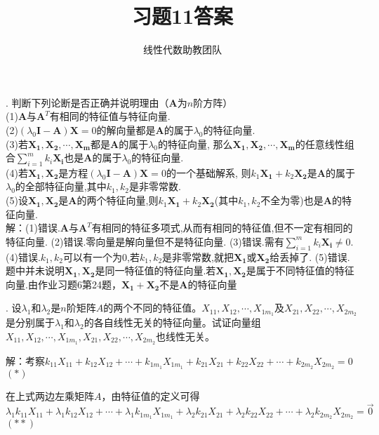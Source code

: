 \documentclass[10pt,twocolumn,letterpaper]{article}
\title{习题11答案}
\author{线性代数助教团队}
\theoremstyle{mythmstyle}
\begin{document}
\maketitle

. 判断下列论断是否正确并说明理由（$\bm{A}$为$n$阶方阵）\\
(1)$\bm{A}$与$\bm{A}^T$有相同的特征值与特征向量.\\
(2)$\left( {{\lambda _0}\bm{I} - \bm{A}} \right)\bm{X} = 0$的解向量都是$\bm{A}$的属于${\lambda _0}$的特征向量.\\
(3)若$\bm{X_1,X_2, \cdots ,X_m}$都是$\bm{A}$的属于${\lambda _0}$的特征向量,
那么$\bm{X_1,X_2, \cdots ,X_m}$的任意线性组合$\sum\limits_{i = 1}^m {{k_i}\bm{X_i}} $也是$\bm{A}$的属于${\lambda _0}$的特征向量.\\
(4)若$\bm{X_1,X_2}$是方程$\left( {{\lambda _0}\bm{I} - \bm{A}} \right)\bm{X} = 0$的一个基础解系,
则${k_1}\bm{X_1} + {k_2}\bm{X_2}$是$\bm{A}$的属于${\lambda _0}$的全部特征向量,其中${k_1},{k_2}$是非零常数.\\
(5)设$\bm{X_1,X_2}$是$\bm{A}$的两个特征向量,则${k_1}\bm{X_1} + {k_2}\bm{X_2}$(其中${k_1},{k_2}$不全为零)也是$\bm{A}$的特征向量.\\

\noindent 解：(1)错误.$\bm{A}$与$\bm{A}^T$有相同的特征多项式,从而有相同的特征值,但不一定有相同的特征向量.
(2)错误.零向量是解向量但不是特征向量.
(3)错误.需有$\sum\limits_{i = 1}^m {{k_i}\bm{X_i}} \ne 0$.
(4)错误.${k_1},{k_2}$可以有一个为0,若${k_1},{k_2}$是非零常数,就把$\bm{X_1}$或$\bm{X_2}$给丢掉了.
(5)错误.题中并未说明$\bm{X_1,X_2}$是同一特征值的特征向量.若$\bm{X_1,X_2}$是属于不同特征值的特征向量.由作业习题6第24题，$\bm{X_1} + \bm{X_2}$不是$\bm{A}$的特征向量

\vspace{1em}
. 设$\lambda_1$和$\lambda_2$是$n$阶矩阵$A$的两个不同的特征值。$X_{11}, X_{12}, \cdots, X_{1m_1}$及$X_{21}, X_{22}, \cdots, X_{2m_2}$是分别属于$\lambda_1$和$\lambda_2$的各自线性无关的特征向量。试证向量组$X_{11}, X_{12}, \cdots, X_{1m_1}, X_{21}, X_{22}, \cdots, X_{2m_2}$也线性无关。

\noindent 解：考察$k_{11}X_{11} + k_{12}X_{12} + \cdots + k_{1m_1}X_{1m_1} + k_{21}X_{21} + k_{22}X_{22} + \cdots + k_{2m_2}X_{2m_2} = 0$$(*)$

在上式两边左乘矩阵$A$，由特征值的定义可得$\lambda_1 k_{11}X_{11} + \lambda_1 k_{12}X_{12} + \cdots + \lambda_1 k_{1m_1}X_{1m_1} + \lambda_2 k_{21}X_{21} + \lambda_2 k_{22}X_{22} + \cdots + \lambda_2 k_{2m_2}X_{2m_2} = \vec{0}$$(**)$
\end{document}
